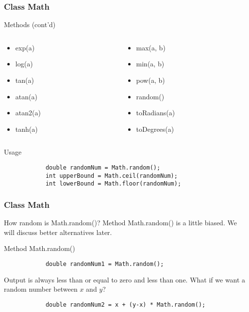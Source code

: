 \documentclass[10pt, compress]{beamer}
\begin{document}
\begin{frame}[fragile]
	\frametitle{Class Math}
	\begin{block}{Methods (cont'd)}
		\begin{columns}
			\begin{column}{0.5\textwidth}
				\begin{itemize}
					\item[] exp(a)
					\item[] log(a)
					\item[] tan(a)
					\item[] atan(a)
					\item[] atan2(a)
					\item[] tanh(a)
				\end{itemize}
			\end{column}
			\begin{column}{0.5\textwidth}
				\begin{itemize}
					\item[] max(a, b)
					\item[] min(a, b)
					\item[] pow(a, b)
					\item[] random()
					\item[] toRadians(a)
					\item[] toDegrees(a)
				\end{itemize}
			\end{column}
		\end{columns}
	\end{block}
	\begin{block}{Usage}
		\begin{verbatim}
			double randomNum = Math.random();
			int upperBound = Math.ceil(randomNum);
			int lowerBound = Math.floor(randomNum);
		\end{verbatim}
	\end{block}
\end{frame}

\begin{frame}[fragile]
	\frametitle{Class Math}
	\begin{block}{How random is Math.random()?}
		Method Math.random() is a little biased. We will discuss better alternatives later.
	\end{block}
	\begin{block}{Method Math.random()}
		\begin{verbatim}
			double randomNum1 = Math.random();
		\end{verbatim}
		Output is always less than or equal to zero and less than one. What if we want a random number between $x$ and $y$?
		\begin{verbatim}
			double randomNum2 = x + (y-x) * Math.random();
		\end{verbatim}
	\end{block}
\end{frame}
\end{document}
